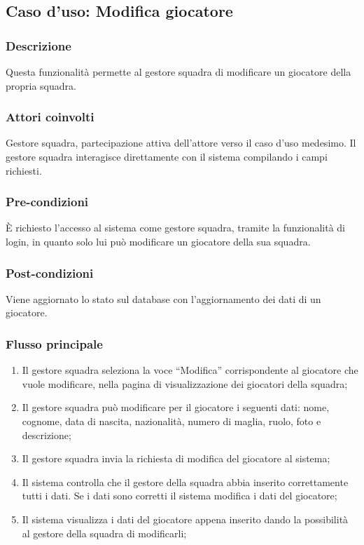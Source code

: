 %
%
\subsection{Caso d'uso: Modifica giocatore}
\label{uc-modifica-giocatore}

\subsubsection*{Descrizione}
Questa funzionalità permette al gestore squadra di modificare un giocatore della propria squadra.

\subsubsection*{Attori coinvolti}
Gestore squadra, partecipazione attiva dell'attore verso il caso d'uso medesimo.
Il gestore squadra interagisce direttamente con il sistema compilando i campi richiesti.

\subsubsection*{Pre-condizioni}
È richiesto l'accesso al sistema come gestore squadra, tramite la funzionalità di login, in quanto solo lui può modificare un giocatore della sua squadra.

\subsubsection*{Post-condizioni}
Viene aggiornato lo stato sul database con l'aggiornamento dei dati di un giocatore.

\subsubsection*{Flusso principale}

\begin{enumerate}
	
	\item
	Il gestore squadra seleziona la voce ``Modifica'' corrispondente al giocatore che vuole modificare, nella pagina di visualizzazione dei giocatori della squadra;
	
	\item
	Il gestore squadra può modificare per il giocatore i seguenti dati: nome, cognome, data di nascita, nazionalità, numero di maglia, ruolo, foto e descrizione;
	
	\item
	Il gestore squadra invia la richiesta di modifica del giocatore al sistema;
	
	\item
	Il sistema controlla che il gestore della squadra abbia inserito correttamente tutti i dati. Se i dati sono corretti il sistema modifica i dati del giocatore;
	
	\item
	Il sistema visualizza i dati del giocatore appena inserito dando la possibilità al gestore della squadra di modificarli;
	
\end{enumerate}

